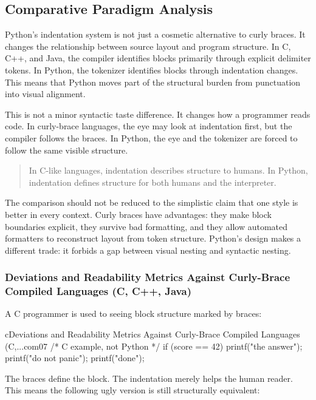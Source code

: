 \subsection{Comparative Paradigm Analysis}

Python's indentation system is not just a cosmetic alternative to curly braces. It changes the relationship between source layout and program structure. In C, C++, and Java, the compiler identifies blocks primarily through explicit delimiter tokens. In Python, the tokenizer identifies blocks through indentation changes. This means that Python moves part of the structural burden from punctuation into visual alignment.

This is not a minor syntactic taste difference. It changes how a programmer reads code. In curly-brace languages, the eye may look at indentation first, but the compiler follows the braces. In Python, the eye and the tokenizer are forced to follow the same visible structure.

\begin{quote}
In C-like languages, indentation describes structure to humans. In Python, indentation defines structure for both humans and the interpreter.
\end{quote}

The comparison should not be reduced to the simplistic claim that one style is better in every context. Curly braces have advantages: they make block boundaries explicit, they survive bad formatting, and they allow automated formatters to reconstruct layout from token structure. Python's design makes a different trade: it forbids a gap between visual nesting and syntactic nesting.

\subsubsection{Deviations and Readability Metrics Against Curly-Brace Compiled Languages (C, C++, Java)}

A C programmer is used to seeing block structure marked by braces:

\begin{codebox}[]{c}{Deviations and Readability Metrics Against Curly-Brace Compiled Languages (C,...}{com07}
/* C example, not Python */
if (score == 42) {
    printf("the answer\n");
    printf("do not panic\n");
}
printf("done\n");
\end{codebox}


The braces define the block. The indentation merely helps the human reader. This means the following ugly version is still structurally equivalent:

